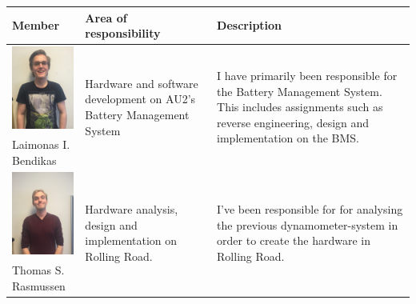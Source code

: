 \newpage
\begin{tabular}[c]{|p{3cm}| p{5cm} | p{6cm}|}
	\hline
	\textbf{Member} & \textbf{Area of responsibility} & \textbf{Description}\\\hline
	
	\phantom{Test}
	\includegraphics[width=3cm]{Introduction/TeamPictures/Laimonas} & \multirow{2}{5cm}{Hardware and software development on AU2's Battery Management System} & \multirow{2}{6cm}{I have primarily been responsible for the Battery Management System. This includes assignments such as reverse engineering, design and implementation on the BMS.} \\
	Laimonas I. \newline Bendikas & & \\ \hline
		
	\phantom{Test}
	\includegraphics[width=3cm]{Introduction/TeamPictures/ThomasR} & \multirow{2}{5cm}{Hardware analysis, design and implementation on Rolling Road.} & \multirow{2}{6cm}{I've been responsible for for analysing the previous dynamometer-system in order to create the hardware in Rolling Road.} \\
	Thomas S. \newline Rasmussen & & \\ \hline
		

\end{tabular}
